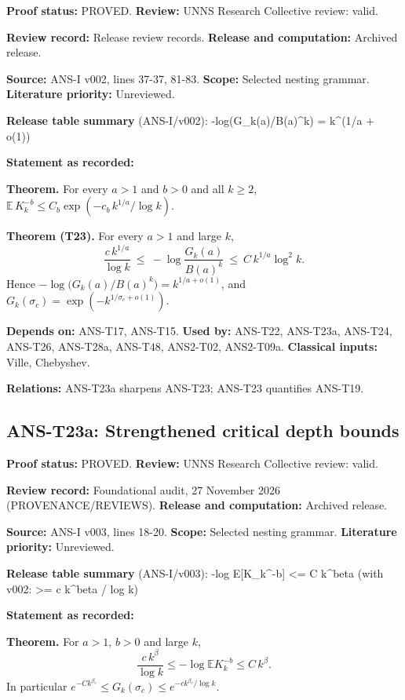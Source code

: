 \documentclass[
  11pt,
]{article}
\begin{document}
\textbf{Proof status:} PROVED. \textbf{Review:} UNNS Research Collective
review: valid.

\textbf{Review record:} Release review records. \textbf{Release and
computation:} Archived release.

\textbf{Source:} ANS-I v002, lines 37-37, 81-83. \textbf{Scope:}
Selected nesting grammar. \textbf{Literature priority:} Unreviewed.

\textbf{Release table summary} (ANS-I/v002): -log(G\_k(a)/B(a)\^{}k) =
k\^{}(1/a + o(1))

\textbf{Statement as recorded:}

\textbf{Theorem.} For every \(a>1\) and \(b>0\) and all \(k\ge2\),
\(\mathbb E\,K_k^{-b}\le C_b\exp(-c_b\,k^{1/a}/\log k)\).

\textbf{Theorem (T23).} For every \(a>1\) and large \(k\),
\[\frac{c\,k^{1/a}}{\log k}\ \le\ -\log\frac{G_k(a)}{B(a)^k}\ \le\ C\,k^{1/a}\log^2k .\]
Hence \(-\log\big(G_k(a)/B(a)^k\big)=k^{1/a+o(1)}\), and
\(G_k(\sigma_c)=\exp(-k^{1/\sigma_c+o(1)})\).

\textbf{Depends on:} ANS-T17, ANS-T15. \textbf{Used by:} ANS-T22,
ANS-T23a, ANS-T24, ANS-T26, ANS-T28a, ANS-T48, ANS2-T02, ANS2-T09a.
\textbf{Classical inputs:} Ville, Chebyshev.

\textbf{Relations:} ANS-T23a sharpens ANS-T23; ANS-T23 quantifies
ANS-T19.

\hypertarget{ans-t23a-strengthened-critical-depth-bounds}{%
\subsection{ANS-T23a: Strengthened critical depth
bounds}\label{ans-t23a-strengthened-critical-depth-bounds}}

\textbf{Proof status:} PROVED. \textbf{Review:} UNNS Research Collective
review: valid.

\textbf{Review record:} Foundational audit, 27 November 2026
(PROVENANCE/REVIEWS). \textbf{Release and computation:} Archived
release.

\textbf{Source:} ANS-I v003, lines 18-20. \textbf{Scope:} Selected
nesting grammar. \textbf{Literature priority:} Unreviewed.

\textbf{Release table summary} (ANS-I/v003): -log E{[}K\_k\^{}-b{]}
\textless= C k\^{}beta (with v002: \textgreater= c k\^{}beta / log k)

\textbf{Statement as recorded:}

\textbf{Theorem.} For \(a>1\), \(b>0\) and large \(k\),
\[\frac{c\,k^{\beta}}{\log k}\le-\log\mathbb E K_k^{-b}\le C\,k^{\beta}.\]
In particular
\(e^{-Ck^{\beta_c}}\le G_k(\sigma_c)\le e^{-ck^{\beta_c}/\log k}\).
\end{document}
